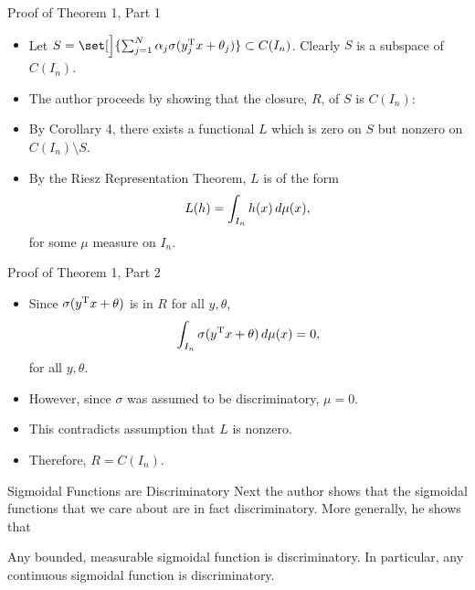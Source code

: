 \documentclass[11pt,letterpaper]{beamer}
\begin{document}
\begin{frame}{Proof of Theorem 1, Part 1}
  \begin{itemize}
  \item Let $S=\set[\Big]{\sum_{j=1}^N
      \alpha_j\sigma( y_j^\rmT x+\theta_j)}\subset C(I_n)$. Clearly $S$
    is a subspace of $C(I_n)$.
  \item The author proceeds by showing that the closure, $R$, of $S$ is
    $C(I_n)$:
  \item By Corollary 4, there exists a functional $L$ which is zero on $S$ but
    nonzero on $C(I_n)\setminus S$.
  \item By the Riesz Representation Theorem, $L$ is of the form
    \[
      L(h)=\int_{I_n}h(x)\mathop{}\!d\mu(x),
    \]
    for some $\mu$ measure on $I_n$.
  \end{itemize}
\end{frame}

\begin{frame}{Proof of Theorem 1, Part 2}
  \begin{itemize}
  \item Since $\sigma( y^{\mathrm{T}} x+\theta)$ is in $R$ for all $ y,\theta$,
    \[
      \int_{I_n}\sigma( y^{\mathrm{T}} x+\theta)\mathop{}\!d\mu( x)=0,
    \]
    for all $ y,\theta$.
  \item However, since $\sigma$ was assumed to be discriminatory, $\mu=0$.
  \item This contradicts assumption that $L$ is nonzero.
  \item Therefore, $R=C(I_n)$.
  \end{itemize}
\end{frame}

\begin{frame}{Sigmoidal Functions are Discriminatory}
  Next the author shows that the sigmoidal functions that we care about are in
  fact discriminatory. More generally, he shows that
  \begin{lemma}
    Any bounded, measurable sigmoidal function is discriminatory. In particular,
    any continuous sigmoidal function is discriminatory.
  \end{lemma}
\end{frame}
\end{document}
